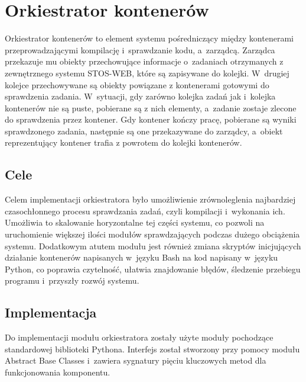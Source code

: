 \section{Orkiestrator kontenerów}
Orkiestrator kontenerów to element systemu pośredniczący między kontenerami przeprowadzającymi kompilację i~sprawdzanie kodu, a~zarządcą. Zarządca przekazuje mu obiekty przechowujące informacje o~zadaniach otrzymanych z zewnętrznego systemu STOS-WEB, które są zapisywane do kolejki. W~drugiej kolejce przechowywane są obiekty powiązane z kontenerami gotowymi do sprawdzenia zadania. W~sytuacji, gdy zarówno kolejka zadań jak i~kolejka kontenerów nie są puste, pobierane są z nich elementy, a~zadanie zostaje zlecone do sprawdzenia przez kontener. Gdy kontener kończy pracę, pobierane są wyniki sprawdzonego zadania, następnie są one przekazywane do zarządcy, a~obiekt reprezentujący kontener trafia z powrotem do kolejki kontenerów.

\subsection{Cele}
Celem implementacji orkiestratora było umożliwienie zrównoleglenia najbardziej czasochłonnego procesu sprawdzania zadań, czyli kompilacji i~wykonania ich. Umożliwia to skalowanie horyzontalne tej części systemu, co pozwoli na uruchomienie większej ilości modułów sprawdzających podczas dużego obciążenia systemu. Dodatkowym atutem modułu jest również zmiana skryptów inicjujących działanie kontenerów napisanych w~języku Bash na kod napisany w~języku Python, co poprawia czytelność, ułatwia znajdowanie błędów, śledzenie przebiegu programu i~przyszły rozwój systemu.

\subsection{Implementacja}
Do implementacji modułu orkiestratora zostały użyte moduły pochodzące standardowej biblioteki Pythona. Interfejs został stworzony przy pomocy modułu Abstract Base Classes\cite{pythonAbc} i~zawiera sygnatury pięciu kluczowych metod dla funkcjonowania komponentu. 

